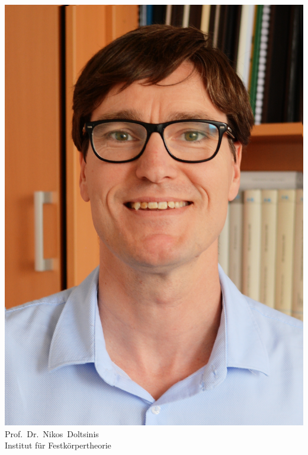 \begin{multicols}{2}
\begin{center}
\includegraphics[width=\columnwidth, height=0.35\textheight]{res/vorstellungsfotos/doltsinis.jpg}\\
\smallskip
Prof.\ Dr.\ Nikos\ Doltsinis\\
Institut für Festkörpertheorie
\end{center}


\end{multicols}
